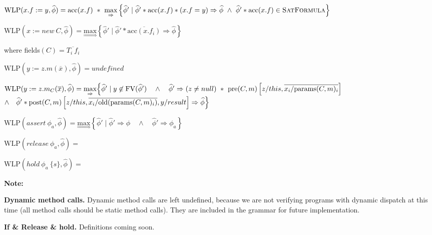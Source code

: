 \documentclass {article}
\newcommand{\fphi}{\widehat{\phi}}
\newcommand{\acc}[1]{\text{acc}(#1)}
\newcommand{\imp}{\Rightarrow}
\newcommand{\maximp}[2]{\underset{\Rightarrow}{\text{max}}\left\{#1 \mid #2\right\}}
\newcommand{\wlp}[2]{\text{WLP}(#1,#2)}
\newcommand{\satdef}{\textsc{SatFormula}}
\begin{document}
$\wlp{x.f := y}{\fphi} = \acc{x.f} \ \ast \ \maximp{\fphi'}{\fphi' \ast \acc{x.f} \ast (x.f = y) \imp \fphi \ \wedge \ \fphi' * \acc{x.f} \in \satdef} $

\vspace{0.5cm}

$\wlp{x := new\ C}{\fphi} = \maximp{\fphi'}{ \fphi' \ast \overline{\acc{x.f_i}} \imp \fphi}$


\indent  \hspace{4cm} where fields$(C) = \overline{T_i \ f_i}$

\vspace{0.5cm}

$\wlp{y := z.m(\overline{x})}{\fphi} = undefined$

\vspace{0.5cm}

$\wlp{y := z.m_C(\overline{x})}{\fphi} = \underset{\Rightarrow}{\text{max}} \Big{\{} \fphi' \mid y \not \in \text{FV}(\fphi') \quad \wedge \quad \fphi' \imp (z \neq null) \ \ast \ \text{pre}(C,m)\left[z/this, \overline{x_i/\text{params}(C,m)_i}\right] $ 
\indent \hspace{4cm} $ \wedge \quad \fphi' \ast \text{post}(C,m)\left[z/this, \overline{x_i/\text{old}(\text{params}(C,m)_i)}, y/result \right] \imp \fphi \Big{\}}$

\vspace{0.5cm}

$\wlp{assert\ \phi_a}{\fphi} = \maximp{\fphi'}{\fphi' \imp \fphi \quad \wedge \quad \fphi' \imp \phi_a} $

\vspace{0.5cm}

$\wlp{release \ \phi_a}{\fphi} = $

\vspace{0.5cm}

$\wlp{hold \ \phi_a \ \{s\}}{\fphi} = $

\vspace{0.5cm}

\noindent \textbf{Note:} 

\textbf{Dynamic method calls.} Dynamic method calls are left undefined, because we are not verifying programs with dynamic dispatch at this time (all method calls should be static method calls). They are included in the grammar for future implementation.

\textbf{If \& Release \& hold.} Definitions coming soon.
\end{document}
